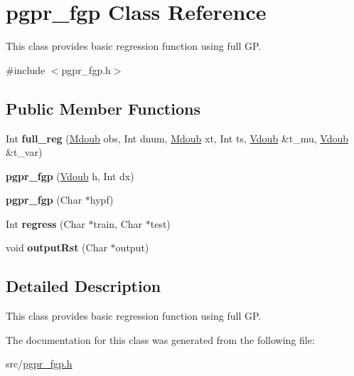\hypertarget{classpgpr__fgp}{\section{pgpr\+\_\+fgp Class Reference}
\label{classpgpr__fgp}
}


This class provides basic regression function using full G\+P.  




{\ttfamily \#include $<$pgpr\+\_\+fgp.\+h$>$}

\subsection*{Public Member Functions}
\begin{DoxyCompactItemize}
\item 
\hypertarget{classpgpr__fgp_abafaa50876ec959782f9eb24873ad472}{Int {\bfseries full\+\_\+reg} (\hyperlink{classpgpr__matrix}{Mdoub} obs, Int dnum, \hyperlink{classpgpr__matrix}{Mdoub} xt, Int ts, \hyperlink{classpgpr__vector}{Vdoub} \&t\+\_\+mu, \hyperlink{classpgpr__vector}{Vdoub} \&t\+\_\+var)}\label{classpgpr__fgp_abafaa50876ec959782f9eb24873ad472}

\item 
\hypertarget{classpgpr__fgp_aef1ddc0350fb260e0deb163d361445d9}{{\bfseries pgpr\+\_\+fgp} (\hyperlink{classpgpr__vector}{Vdoub} h, Int dx)}\label{classpgpr__fgp_aef1ddc0350fb260e0deb163d361445d9}

\item 
\hypertarget{classpgpr__fgp_a43db9cc3e874faa3de98db6e47861e9b}{{\bfseries pgpr\+\_\+fgp} (Char $\ast$hypf)}\label{classpgpr__fgp_a43db9cc3e874faa3de98db6e47861e9b}

\item 
\hypertarget{classpgpr__fgp_aaaac0743b16a448d2466be1d483554e1}{Int {\bfseries regress} (Char $\ast$train, Char $\ast$test)}\label{classpgpr__fgp_aaaac0743b16a448d2466be1d483554e1}

\item 
\hypertarget{classpgpr__fgp_a34744aec38cc720e458ee8f5de002c0a}{void {\bfseries output\+Rst} (Char $\ast$output)}\label{classpgpr__fgp_a34744aec38cc720e458ee8f5de002c0a}

\end{DoxyCompactItemize}


\subsection{Detailed Description}
This class provides basic regression function using full G\+P. 

The documentation for this class was generated from the following file\+:\begin{DoxyCompactItemize}
\item 
src/\hyperlink{pgpr__fgp_8h}{pgpr\+\_\+fgp.\+h}\end{DoxyCompactItemize}
